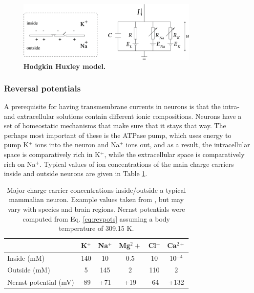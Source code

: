 \begin{figure}[!ht]
\begin{center}
\includegraphics[width=0.8\textwidth]{Fig02/HHmodel.png}
\end{center}
\caption{\textbf{Hodgkin Huxley model.}
}
\label{fig:HHcircuit}
\end{figure}


\subsubsection{Reversal potentials}
A prerequisite for having transmembrane currents in neurons is that the intra- and extracellular solutions contain different ionic compositions. Neurons have a set of homeostatic mechanisms that make sure that it stays that way. The perhaps most important of these is the ATPase pump, which uses energy to pump K$^+$ ions into the neuron and Na$^+$ ions out, and as a result, the intracellular space is comparatively rich in K$^+$, while the extracellular space is comparatively rich on Na$^+$. Typical values of ion concentrations of the main charge carriers inside and outside neurons are given in Table \ref{table:ion-concentrations}.

\begin{table}[h]
\centering
\caption{Major charge carrier concentrations inside/outside a typical mammalian neuron. Example values taken from \cite{Wu2019}, but may vary with species and brain regions. Nernst potentials were computed from Eq. \ref{eq:revpots} assuming a body temperature of 309.15 K.}
\label{table:ion-concentrations}
{\begin{tabular}{lccccc}\toprule
						    & 	K$^+$	&	Na$^+$	&	Mg$^2+$	  &	Cl$^-$	&	Ca$^{2+}$	 \\ \midrule
Inside (mM)				    & 140		&		10	&		0.5	&	10		&  	10$^{-4}$	  	\\
Outside (mM)			           & 5			&		145	&		2	&	110 		&		2		  	\\
Nernst potential (mV)		    &	-89		&	    	+71	&		+19	&	-64		&		+132 		  	\\
\bottomrule
\end{tabular}}{}
\end{table}

